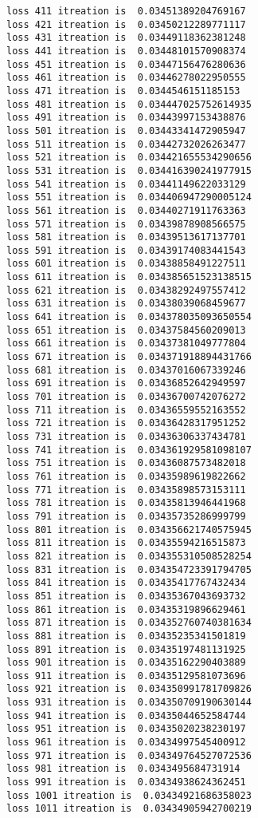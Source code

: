 \documentclass[11pt]{article}
\begin{document}
\begin{Verbatim}[commandchars=\\\{\}]
loss 411 itreation is  0.03451389204769167
loss 421 itreation is  0.03450212289771117
loss 431 itreation is  0.03449118362381248
loss 441 itreation is  0.03448101570908374
loss 451 itreation is  0.03447156476280636
loss 461 itreation is  0.03446278022950555
loss 471 itreation is  0.0344546151185153
loss 481 itreation is  0.034447025752614935
loss 491 itreation is  0.03443997153438876
loss 501 itreation is  0.03443341472905947
loss 511 itreation is  0.03442732026263477
loss 521 itreation is  0.034421655534290656
loss 531 itreation is  0.034416390241977915
loss 541 itreation is  0.03441149622033129
loss 551 itreation is  0.034406947290005124
loss 561 itreation is  0.03440271911763363
loss 571 itreation is  0.03439878908566575
loss 581 itreation is  0.03439513617137701
loss 591 itreation is  0.03439174083441543
loss 601 itreation is  0.03438858491227511
loss 611 itreation is  0.034385651523138515
loss 621 itreation is  0.03438292497557412
loss 631 itreation is  0.03438039068459677
loss 641 itreation is  0.034378035093650554
loss 651 itreation is  0.03437584560209013
loss 661 itreation is  0.03437381049777804
loss 671 itreation is  0.034371918894431766
loss 681 itreation is  0.03437016067339246
loss 691 itreation is  0.03436852642949597
loss 701 itreation is  0.03436700742076272
loss 711 itreation is  0.03436559552163552
loss 721 itreation is  0.03436428317951252
loss 731 itreation is  0.03436306337434781
loss 741 itreation is  0.034361929581098107
loss 751 itreation is  0.03436087573482018
loss 761 itreation is  0.03435989619822662
loss 771 itreation is  0.03435898573153111
loss 781 itreation is  0.03435813946441968
loss 791 itreation is  0.03435735286999799
loss 801 itreation is  0.034356621740575945
loss 811 itreation is  0.03435594216515873
loss 821 itreation is  0.034355310508528254
loss 831 itreation is  0.034354723391794705
loss 841 itreation is  0.03435417767432434
loss 851 itreation is  0.03435367043693732
loss 861 itreation is  0.03435319896629461
loss 871 itreation is  0.034352760740381634
loss 881 itreation is  0.03435235341501819
loss 891 itreation is  0.03435197481131925
loss 901 itreation is  0.03435162290403889
loss 911 itreation is  0.03435129581073696
loss 921 itreation is  0.034350991781709826
loss 931 itreation is  0.034350709190630144
loss 941 itreation is  0.03435044652584744
loss 951 itreation is  0.03435020238230197
loss 961 itreation is  0.03434997545400912
loss 971 itreation is  0.034349764527072536
loss 981 itreation is  0.0343495684731914
loss 991 itreation is  0.03434938624362451
loss 1001 itreation is  0.03434921686358023
loss 1011 itreation is  0.03434905942700219

\end{Verbatim}
\end{document}
